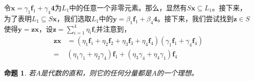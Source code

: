\documentclass[mathserif,hyperref,UTF8,openany,b5paper]{ctexbook}
\newtheorem{pro}{命题}[section]
\begin{document}
令$\mathbf{x}=\gamma_1\mathbf{f}_1+\gamma_4\mathbf{4}$为$L_1$中的任意一个非零元素。那么，显然有$S\mathbf{x}\subseteq L_1$。接下来，为了表明$L_1\subseteq S\mathbf{x}$，我们选取$L_1$中的$\mathbf{y}=\beta_1\mathbf{f}_1+\beta_4\mathbf{4}$。接下来，我们尝试找到$\mathbf{z}\in S$使得$\mathbf{y=zx}$，设$\mathbf{z}=\sum_{i=1}^{4}\eta_i\mathbf{f}_i$并注意到，
\begin{align}
    \mathbf{zx}&=(\eta_1\mathbf{f}_1+\eta_2\mathbf{f}_2+\eta_3\mathbf{f}_3+\eta_4\mathbf{f}_4)(\gamma_1\mathbf{f}_1+\gamma_4\mathbf{f}_4)\\
    =&(\eta_1\gamma_1+\eta_2\gamma_4)\mathbf{f}_1+(\eta_3\gamma_4+\eta_4\gamma_1)\mathbf{f}_4
\end{align}

\begin{pro}
    若$A$是代数的直和，则它的任何分量都是$A$的一个理想。
\end{pro}
\small\printindex
\end{document}
